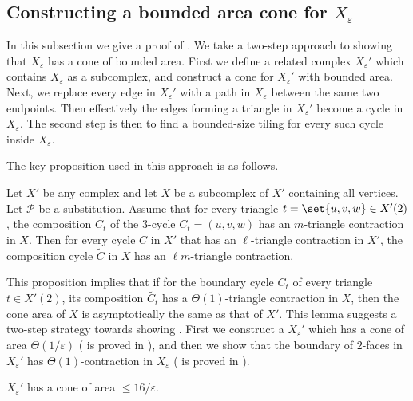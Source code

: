 \subsection[Constructing a bounded area cone for the Johnson complex]{Constructing a bounded area cone for \(X_\varepsilon\)}\label{sec:cone-for-X}
In this subsection we give a proof of . We take a two-step approach to showing that $X_\varepsilon$ has a cone of bounded area. 
First we define a related complex $X_\varepsilon'$ which contains $X_\varepsilon$ as a subcomplex, and construct a cone for $X_\varepsilon'$ with bounded area. Next, we replace every edge in $X_\varepsilon'$ with a path in $X_\varepsilon$ between the same two endpoints. Then effectively the edges forming a triangle in $X_\varepsilon'$ become a cycle in $X_\varepsilon$. The second step is then to find a bounded-size tiling for every such cycle inside $X_\varepsilon$.

The key proposition used in this approach is as follows. 
\begin{proposition} \label{lem:cone-area-composition}
    Let \(X'\) be any complex and let \(X\) be a subcomplex of \(X'\) containing all vertices. Let \(\mathcal{P}\) be a substitution. Assume that for every triangle \(t=\set{u,v,w} \in X'(2)\), the composition \(\tilde{C_t}\) of the \(3\)-cycle \(C_t=(u,v,w)\) has an \(m\)-triangle contraction in \(X\). 
    Then for every cycle $C$ in $X'$ that has an $\ell$-triangle contraction in $X'$, the composition cycle $\tilde{C}$ in $X$ has an $\ell m$-triangle contraction.
\end{proposition}

This proposition implies that if 
for the boundary cycle $C_t$ of every triangle $t \in X'(2)$, its composition $\tilde{C_t}$ has a $\Theta(1)$-triangle contraction in $X$, then the cone area of $X$ is asymptotically the same as that of $X'$.
This lemma suggests a two-step strategy towards showing . First we construct a $X_\varepsilon'$ which has a cone of area $\Theta(1/\varepsilon)$ ( is proved in ), and then we show that the boundary of $2$-faces in $X_\varepsilon'$ has $\Theta(1)$-contraction in $X_\varepsilon$ ( is proved in ).

\begin{claim} \label{claim:X'-good-cone}
    $X_\varepsilon'$ has a cone of area \(\le 16/\varepsilon \).
\end{claim}

